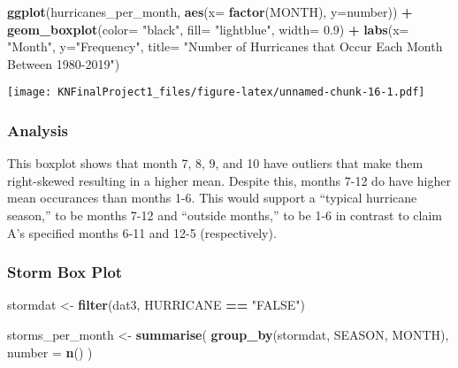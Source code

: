 \documentclass[
]{article}
\newenvironment{Shaded}{\begin{snugshade}}{\end{snugshade}}
\newcommand{\DataTypeTok}[1]{\textcolor[rgb]{0.13,0.29,0.53}{#1}}
\newcommand{\FloatTok}[1]{\textcolor[rgb]{0.00,0.00,0.81}{#1}}
\newcommand{\KeywordTok}[1]{\textcolor[rgb]{0.13,0.29,0.53}{\textbf{#1}}}
\newcommand{\NormalTok}[1]{#1}
\newcommand{\OperatorTok}[1]{\textcolor[rgb]{0.81,0.36,0.00}{\textbf{#1}}}
\newcommand{\StringTok}[1]{\textcolor[rgb]{0.31,0.60,0.02}{#1}}
\begin{document}
\begin{Shaded}
\begin{Highlighting}[]
\KeywordTok{ggplot}\NormalTok{(hurricanes_per_month, }\KeywordTok{aes}\NormalTok{(}\DataTypeTok{x=} \KeywordTok{factor}\NormalTok{(MONTH), }\DataTypeTok{y=}\NormalTok{number)) }\OperatorTok{+}
\StringTok{  }\KeywordTok{geom_boxplot}\NormalTok{(}\DataTypeTok{color=} \StringTok{"black"}\NormalTok{, }\DataTypeTok{fill=} \StringTok{"lightblue"}\NormalTok{, }\DataTypeTok{width=} \FloatTok{0.9}\NormalTok{) }\OperatorTok{+}\StringTok{ }
\StringTok{  }\KeywordTok{labs}\NormalTok{(}\DataTypeTok{x=} \StringTok{"Month"}\NormalTok{, }\DataTypeTok{y=}\StringTok{"Frequency"}\NormalTok{, }\DataTypeTok{title=} \StringTok{"Number of Hurricanes that Occur Each Month Between 1980-2019"}\NormalTok{)}
\end{Highlighting}
\end{Shaded}

\texttt{[image: KNFinalProject1\_files/figure-latex/unnamed-chunk-16-1.pdf]}

\hypertarget{analysis}{%
\subsubsection{Analysis}\label{analysis}}

This boxplot shows that month 7, 8, 9, and 10 have outliers that make
them right-skewed resulting in a higher mean. Despite this, months 7-12
do have higher mean occurances than months 1-6. This would support a
``typical hurricane season,'' to be months 7-12 and ``outside months,''
to be 1-6 in contrast to claim A's specified months 6-11 and 12-5
(respectively).

\hypertarget{storm-box-plot}{%
\subsubsection{Storm Box Plot}\label{storm-box-plot}}

\begin{Shaded}
\begin{Highlighting}[]
\NormalTok{stormdat <-}\StringTok{ }\KeywordTok{filter}\NormalTok{(dat3, HURRICANE }\OperatorTok{==}\StringTok{ "FALSE"}\NormalTok{)}

\NormalTok{storms_per_month <-}\StringTok{ }\KeywordTok{summarise}\NormalTok{(}
  \KeywordTok{group_by}\NormalTok{(stormdat, SEASON, MONTH),}
  \DataTypeTok{number =} \KeywordTok{n}\NormalTok{()}
\NormalTok{)}
\end{Highlighting}
\end{Shaded}
\end{document}
